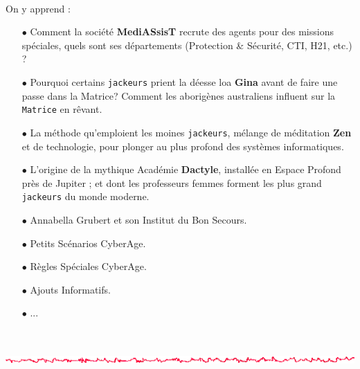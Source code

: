 \documentclass[11pt,twoside,a4paper]{article}
\def\barreCyberAge{\includegraphics[width=\textwidth]{img/Filet_CA.png}}
\begin{document}
\begin{minipage}[ht]{2.00cm} ~\\ \end{minipage} \hfill \begin{minipage}[ht]{0.70\textwidth}
	On y apprend : 
	\begin{itemize}
		\item[$\bullet$] Comment la soci{\'e}t{\'e} \textbf{MediASsisT} recrute des agents pour des missions sp{\'e}ciales, quels sont ses d{\'e}partements (Protection \& S{\'e}curit{\'e}, CTI, H21, etc.) ? 
		\item[$\bullet$] Pourquoi certains \texttt{jackeurs} prient la d{\'e}esse loa \textbf{Gina} avant de faire une passe dans la Matrice? Comment les aborig{\`e}nes australiens influent sur la \texttt{Matrice} en r{\^e}vant. 
		\item[$\bullet$] La m{\'e}thode qu'emploient les moines \texttt{jackeurs}, m{\'e}lange de m{\'e}ditation \textbf{Zen} et de technologie, pour plonger au plus profond des syst{\`e}mes informatiques. 
		\item[$\bullet$] L'origine de la mythique Acad{\'e}mie \textbf{Dactyle}, install{\'e}e en Espace Profond pr{\`e}s de Jupiter ; et dont les professeurs femmes forment les plus grand \texttt{jackeurs} du monde moderne.
		\item[$\bullet$] Annabella Grubert et son Institut du Bon Secours.  
		\item[$\bullet$] Petits Sc{\'e}narios CyberAge. 
		\item[$\bullet$] R{\`e}gles Sp{\'e}ciales CyberAge. 
		\item[$\bullet$] Ajouts Informatifs.  
		\item[$\bullet$] ... 
	\end{itemize} 
\end{minipage} \hfill \begin{minipage}[ht]{2.00cm} ~\\ \end{minipage}

\barreCyberAge

\clearpage
\end{document}
